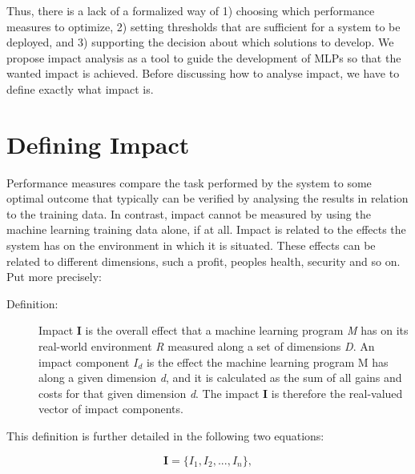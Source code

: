 \documentclass{article}
\begin{document}
Thus, there is a lack of a formalized way of 1) choosing which performance measures to optimize, 2) setting thresholds that are sufficient for a system to be deployed, and 3) supporting the decision about which solutions to develop.
We propose impact analysis as a tool to guide the development of MLPs so that the wanted impact is achieved.
Before discussing how to analyse impact, we have to define exactly what impact is.

\section{Defining Impact}
\label{sec:defining_impact}
Performance measures compare the task performed by the system to some optimal outcome that typically can be verified by analysing the results in relation to the training data.
In contrast, impact cannot be measured by using the machine learning training data alone, if at all.
Impact is related to the effects the system has on the environment in which it is situated.
These effects can be related to different dimensions, such a profit, peoples health, security and so on.
Put more precisely:

\begin{description}
\item [Definition:] Impact \textbf{I} is the overall effect that a machine learning program \emph{M} has on its real-world environment \emph{R} measured along a set of dimensions \emph{D}.
An impact component \emph{$I_d$} is the effect the machine learning program M has along a given dimension \emph{d}, and it is calculated as the sum of all gains and costs for that given dimension \emph{d}.
The impact \textbf{I} is therefore the real-valued vector of impact components.

\end{description}

This definition is further detailed in the following two equations:
 
\begin{equation}
\textbf{I} =  \{I_1, I_2, ..., I_n\},
\end{equation}
\end{document}
